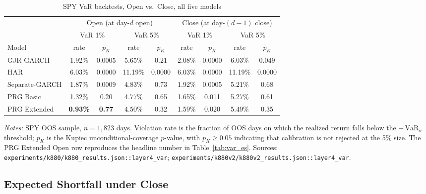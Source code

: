 \documentclass[11pt,a4paper]{article}
\begin{document}
\begin{table}[htbp]
\centering
\caption{SPY VaR backtests, Open vs.\ Close, all five models}
\label{app:tab:var_5models}
\small
\begin{tabular}{l cc cc cc cc}
\toprule
 & \multicolumn{4}{c}{Open (at day-$d$ open)}
 & \multicolumn{4}{c}{Close (at day-$(d{-}1)$ close)} \\
\cmidrule(lr){2-5} \cmidrule(lr){6-9}
 & \multicolumn{2}{c}{VaR 1\%} & \multicolumn{2}{c}{VaR 5\%}
 & \multicolumn{2}{c}{VaR 1\%} & \multicolumn{2}{c}{VaR 5\%} \\
\cmidrule(lr){2-3} \cmidrule(lr){4-5} \cmidrule(lr){6-7} \cmidrule(lr){8-9}
Model & rate & $p_K$ & rate & $p_K$ & rate & $p_K$ & rate & $p_K$ \\
\midrule
GJR-GARCH      & 1.92\% & 0.0005 & 5.65\% & 0.21   & 2.08\% & 0.0000 & 6.03\% & 0.049 \\
HAR            & 6.03\% & 0.0000 & 11.19\% & 0.0000 & 6.03\% & 0.0000 & 11.19\% & 0.0000 \\
Separate-GARCH & 1.87\% & 0.0009 & 4.83\% & 0.73   & 1.92\% & 0.0005 & 5.21\% & 0.68 \\
PRG Basic      & 1.32\% & 0.20   & 4.77\% & 0.65   & 1.65\% & 0.011  & 5.27\% & 0.61 \\
PRG Extended   & \textbf{0.93\%} & \textbf{0.77} & 4.50\% & 0.32 & 1.59\% & 0.020 & 5.49\% & 0.35 \\
\bottomrule
\end{tabular}
\begin{flushleft}
\footnotesize
\emph{Notes:} SPY OOS sample, $n = 1{,}823$ days. Violation rate is the
fraction of OOS days on which the realized return falls below the
$-\,\text{VaR}_\alpha$ threshold; $p_K$ is the Kupiec unconditional-coverage
$p$-value, with $p_K \geq 0.05$ indicating that calibration is not
rejected at the 5\% size. The PRG Extended Open row reproduces the
headline number in Table~\ref{tab:var_es}.
Sources: \texttt{experiments/k880/k880\_results.json::layer4\_var};
\texttt{experiments/k880v2/k880v2\_results.json::layer4\_var}.
\end{flushleft}
\end{table}

\subsection*{Expected Shortfall under Close}
\end{document}
